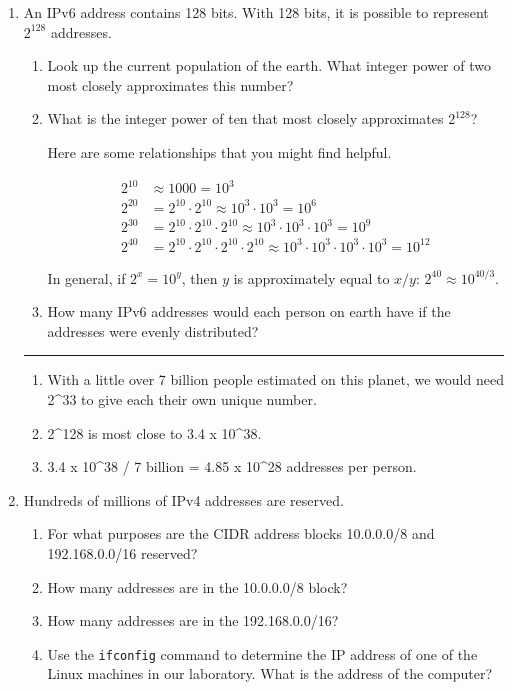 \documentclass[twoside]{article}
\newenvironment{answer}
  {\vspace*{0.2cm} \rule{12cm}{0.04cm} \vspace*{0.2cm}}
  {\vspace*{0.2cm}}
\begin{document}
\begin{enumerate}
\begin{answer}
    \end{answer}

  \item An IPv6 address contains 128 bits. With 128 bits, it
    is possible to represent $2^{128}$ addresses.
  \begin{enumerate}
    \item Look up the current population of the earth. What integer
      power of two most closely approximates this number?
    \item What is the integer power of ten that most closely
      approximates $2^{128}$?

      Here are some relationships that you might find helpful.

      \begin{align*}
        2^{10} & \approx 1000 = 10^3 \\
        2^{20} & = 2^{10} \cdot 2^{10} \approx 10^3 \cdot 10^3 = 10^6 \\
        2^{30} & = 2^{10} \cdot 2^{10} \cdot 2^{10} \approx 10^3 \cdot 10^3 \cdot 10^3 = 10^9 \\
        2^{40} & = 2^{10} \cdot 2^{10} \cdot 2^{10} \cdot 2^{10} \approx
            10^3 \cdot 10^3 \cdot 10^3 \cdot 10^3 = 10^{12}
        \end{align*}

      In general, if $2^x = 10^y$, then $y$ is approximately equal to $x/y$: $2^{40} \approx 10^{40/3}$.
      
    \item How many IPv6 addresses would each person on earth have if the addresses
      were evenly distributed?
    \end{enumerate}

  \begin{answer}

  \begin{enumerate}
    \item With a little over 7 billion people estimated on this planet, we would need 2^33 to give each their own unique number.
    \item 2^128 is most close to 3.4 x 10^38.
    \item 3.4 x 10^38 / 7 billion = 4.85 x 10^28 addresses per person.
    \end{enumerate}

    \end{answer}

  \item Hundreds of millions of IPv4 addresses are reserved.
  \begin{enumerate}
    \item For what purposes are the CIDR address blocks 10.0.0.0/8 and 192.168.0.0/16 reserved?
    \item How many addresses are in the 10.0.0.0/8 block?
    \item How many addresses are in the 192.168.0.0/16?
    \item Use the \verb+ifconfig+ command to determine the IP address of
      one of the Linux machines in our laboratory. What is the address of the computer?
    \end{enumerate}


\end{enumerate}
\end{document}

